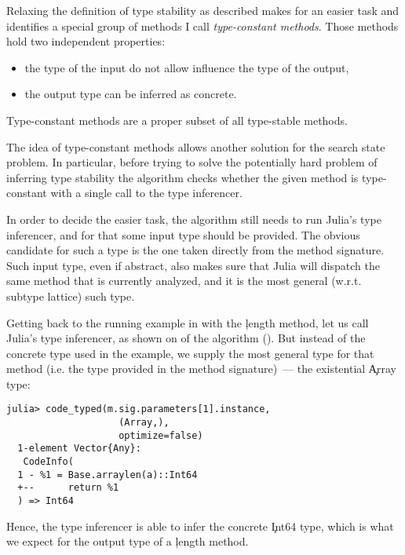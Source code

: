 Relaxing the definition of type stability as described makes for an easier task
and identifies a special group of methods I call \emph{type-constant methods}.
Those methods hold two independent properties:
\begin{itemize}
  \item the type of the input do not allow influence the type of the output,
  \item the output type can be inferred as concrete.
\end{itemize}
Type-constant methods are a proper subset of all type-stable methods.

The idea of type-constant methods allows another solution for the search state
problem. In particular, before trying to solve the potentially hard problem of
inferring type stability the algorithm checks whether the given method is
type-constant with a single call to the type inferencer.


In order to decide the easier task, the algorithm still needs to run Julia's
type inferencer, and for that some input type should be provided. The obvious
candidate for such a type is the one taken directly from the method signature.
Such input type, even if abstract, also makes sure that Julia will dispatch the
same method that is currently analyzed, and it is the most general (w.r.t.
subtype lattice) such type.

Getting back to the running example in  with the
\c{length} method, let us call Julia's type inferencer, as
shown on  of the algorithm (). But
instead of the concrete type used in the example, we supply the most general type
for that method (i.e. the type provided in the method signature)~--- the
existential \c{Array} type:
\begin{lstlisting}[style=jterm]
  julia> code_typed(m.sig.parameters[1].instance,
                    (Array,),
                    optimize=false)
  1-element Vector{Any}:
   CodeInfo(
  1 - %1 = Base.arraylen(a)::Int64
  +--      return %1
  ) => Int64
\end{lstlisting}
Hence, the type inferencer is able to infer the concrete \c{Int64} type, which
is what we expect for the output type of a \c{length} method.

